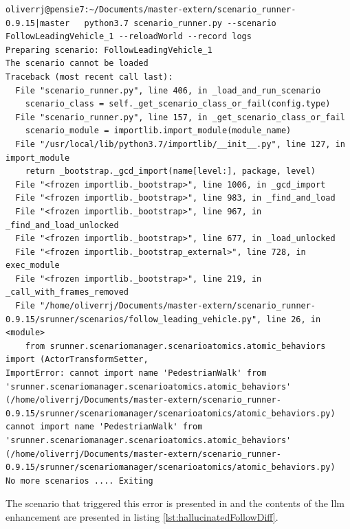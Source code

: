 \begin{lstlisting}[caption={Error message when running the the initially enhanced  FollowLeadingVehicle scenario with halluciantion. }, label={lst:hallucinatedFollowError}]
    oliverrj@pensie7:~/Documents/master-extern/scenario_runner-0.9.15|master   python3.7 scenario_runner.py --scenario FollowLeadingVehicle_1 --reloadWorld --record logs
Preparing scenario: FollowLeadingVehicle_1
The scenario cannot be loaded
Traceback (most recent call last):
  File "scenario_runner.py", line 406, in _load_and_run_scenario
    scenario_class = self._get_scenario_class_or_fail(config.type)
  File "scenario_runner.py", line 157, in _get_scenario_class_or_fail
    scenario_module = importlib.import_module(module_name)
  File "/usr/local/lib/python3.7/importlib/__init__.py", line 127, in import_module
    return _bootstrap._gcd_import(name[level:], package, level)
  File "<frozen importlib._bootstrap>", line 1006, in _gcd_import
  File "<frozen importlib._bootstrap>", line 983, in _find_and_load
  File "<frozen importlib._bootstrap>", line 967, in _find_and_load_unlocked
  File "<frozen importlib._bootstrap>", line 677, in _load_unlocked
  File "<frozen importlib._bootstrap_external>", line 728, in exec_module
  File "<frozen importlib._bootstrap>", line 219, in _call_with_frames_removed
  File "/home/oliverrj/Documents/master-extern/scenario_runner-0.9.15/srunner/scenarios/follow_leading_vehicle.py", line 26, in <module>
    from srunner.scenariomanager.scenarioatomics.atomic_behaviors import (ActorTransformSetter,
ImportError: cannot import name 'PedestrianWalk' from 'srunner.scenariomanager.scenarioatomics.atomic_behaviors' (/home/oliverrj/Documents/master-extern/scenario_runner-0.9.15/srunner/scenariomanager/scenarioatomics/atomic_behaviors.py)
cannot import name 'PedestrianWalk' from 'srunner.scenariomanager.scenarioatomics.atomic_behaviors' (/home/oliverrj/Documents/master-extern/scenario_runner-0.9.15/srunner/scenariomanager/scenarioatomics/atomic_behaviors.py)
No more scenarios .... Exiting

\end{lstlisting}

The scenario that triggered this error is presented in  and the
contents of the \acrshort{llm} enhancement are presented in listing
\ref{lst:hallucinatedFollowDiff}.


